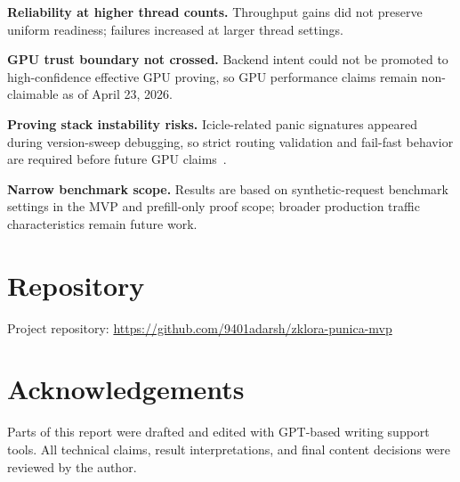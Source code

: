 \documentclass[manuscript,nonacm]{acmart}
\begin{document}
\textbf{Reliability at higher thread counts.} Throughput gains did not preserve uniform readiness; failures increased at larger thread settings.

\textbf{GPU trust boundary not crossed.} Backend intent could not be promoted to high-confidence effective GPU proving, so GPU performance claims remain non-claimable as of April 23, 2026.

\textbf{Proving stack instability risks.} Icicle-related panic signatures appeared during version-sweep debugging, so strict routing validation and fail-fast behavior are required before future GPU claims~\cite{ezklIssue882}.

\textbf{Narrow benchmark scope.} Results are based on synthetic-request benchmark settings in the MVP and prefill-only proof scope; broader production traffic characteristics remain future work.

\section{Repository}

Project repository: \url{https://github.com/9401adarsh/zklora-punica-mvp}

\section{Acknowledgements}

Parts of this report were drafted and edited with GPT-based writing support tools. All technical claims, result interpretations, and final content decisions were reviewed by the author.



\end{document}
